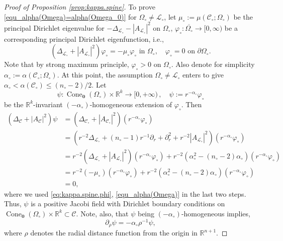 \documentclass[10pt,a4paper]{amsart}
\newcommand{\RR}{\mathbb{R}}
\newcommand{\cC}{\mathcal{C}}
\newcommand{\cL}{\mathcal{L}}
\newcommand{\orig}{\mathbf{0}}
\begin{document}
\begin{proof}[Proof of Proposition \ref{prop:kappa.spine}]
    To prove \eqref{equ_alpha(Omega)=alpha(Omega_0)} for $\Omega
    _\circ \neq \cL_\circ$, let $\mu_\circ:= \mu(\cC_\circ; \Omega_\circ)$ be the principal Dirichlet eigenvalue for $-\Delta_{\cL_\circ} - |A_{\cL_\circ}|^2$ on $\Omega_\circ$, $\varphi_\circ : \overline{\Omega_\circ} \to [0, \infty)$ be a corresponding principal Dirichlet eigenfunction, i.e.,
	\begin{equation} \label{eq:kappa.spine.phi}
		(\Delta_{\cL_\circ} + |A_{\cL_\circ}|^2) \varphi_\circ = -\mu_{\circ} \varphi_\circ \text{ in } \Omega_\circ, \quad \varphi_\circ = 0 \text{ on } \partial \Omega_\circ.
	\end{equation}
    Note that by strong maximum principle, $\varphi_\circ>0$ on $\Omega_\circ$. Also denote for simplicity $\alpha_\circ:= \alpha(\cC_\circ; \Omega_\circ)$. At this point, the assumption $\Omega_\circ\neq \cL_\circ$ enters to give $\alpha_\circ< \alpha(\cC_\circ)\leq (n_\circ-2)/2$. Let \[
      \psi: \operatorname{Cone}_\orig(\Omega_\circ)\times \RR^k \to [0, +\infty)\,, \quad \psi := r^{-\alpha_\circ}\varphi_\circ
    \] 
    be the $\RR^k$-invariant $(-\alpha_\circ)$-homogeneous extension of $\varphi_\circ$. Then 
	\begin{align*}
		 (\Delta_\cC + |A_\cC|^2)\psi 
        & = (\Delta_{\cC_\circ} + |A_{\cC_\circ}|^2) (r^{-\alpha_\circ} \varphi_\circ) \\
		& = (r^{-2} \Delta_{\cL_\circ} + (n_\circ-1) r^{-1} \partial_r + \partial_r^2 + r^{-2} |A_{\cL_\circ}|^2)(r^{-\alpha_\circ} \varphi_\circ) \\
		& = r^{-2} (\Delta_{\cL_\circ} + |A_{\cL_\circ}|^2) (r^{-\alpha_\circ} \varphi_\circ) + r^{-2} (\alpha_\circ^2 - (n_\circ-2) \alpha_\circ) (r^{-\alpha_\circ} \varphi_\circ) \\
		& = r^{-2} (-\mu_\circ) (r^{-\alpha_\circ} \varphi_\circ) + r^{-2} (\alpha_\circ^2 - (n_\circ-2) \alpha_\circ) (r^{-\alpha_{\circ}} \varphi_\circ) \\
		& = 0,
	\end{align*}
	where we used \eqref{eq:kappa.spine.phi}, \eqref{equ_alpha(Omega)} in the last two steps. Thus, $\psi$ is a positive Jacobi field with Dirichlet boundary conditions on $\operatorname{Cone}_\orig(\Omega_\circ) \times \RR^k \subset \cC$. Note, also, that $\psi$ being $(-\alpha_{\circ})$-homogeneous implies,
	\begin{equation} \label{eq:kappa.spine.homogeneous}
		\partial_\rho \psi = - \alpha_{\circ}\rho^{-1} \psi,
	\end{equation}
	where $\rho$ denotes the radial distance function from the origin in $\RR^{n+1}$. 
	

\end{proof}
\end{document}
